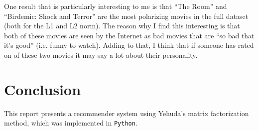 \documentclass{article}
\begin{document}
\begin{table}[h!]
    \centering
    \caption{The three most polarizing movies, using L2 distance.}
    \label{p7}
\end{table}

\begin{table}[h!]
    \centering
    \caption{The three least polarizing movies, using L2 distance.}
    \label{p8}
\end{table}

One result that is particularly interesting to me is that ``The Room'' and ``Birdemic: Shock and Terror''
are the most polarizing movies in the full dataset (both for the L1 and L2 norm). 
The reason why I find this interesting is that both of these movies are seen by the Internet as
bad movies that are ``so bad that it's good'' (i.e. funny to watch). 
Adding to that, I think that if someone has rated on of these two movies it may say a lot about their personality.

\newpage

\section{Conclusion}
This report presents a recommender system using Yehuda's matrix factorization method, which was implemented in \texttt{Python}.
\end{document}
